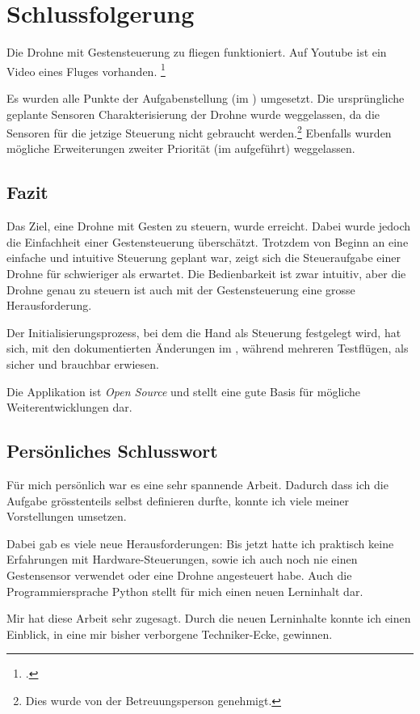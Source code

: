 \chapter{Schlussfolgerung}
Die Drohne mit Gestensteuerung zu fliegen funktioniert.
Auf Youtube ist ein Video eines Fluges vorhanden.
\footcite{Crazyflie_20_with_Leap_Motion_Gesture_controlled_YouTube_2015-09-04}

Es wurden alle Punkte der Aufgabenstellung (im ) umgesetzt. Die ursprüngliche geplante Sensoren Charakterisierung der Drohne wurde weggelassen, da die Sensoren für die jetzige Steuerung nicht gebraucht werden.\footnote{Dies wurde von der Betreuungsperson genehmigt.}
Ebenfalls wurden mögliche Erweiterungen zweiter Priorität (im  aufgeführt) weggelassen.

\section{Fazit}
Das Ziel, eine Drohne mit Gesten zu steuern, wurde erreicht.
Dabei wurde jedoch die Einfachheit einer Gestensteuerung überschätzt.
Trotzdem von Beginn an eine einfache und intuitive Steuerung geplant war, zeigt sich die Steueraufgabe einer Drohne für schwieriger als erwartet.
Die Bedienbarkeit ist zwar intuitiv, aber die Drohne genau zu steuern ist auch mit der Gestensteuerung eine grosse Herausforderung.

Der Initialisierungsprozess, bei dem die Hand als Steuerung festgelegt wird, hat sich, mit den dokumentierten Änderungen im , während mehreren Testflügen, als sicher und brauchbar erwiesen.

Die Applikation ist \textit{Open Source} und stellt eine gute Basis für mögliche Weiterentwicklungen dar.


\section{Persönliches Schlusswort}
Für mich persönlich war es eine sehr spannende Arbeit.
Dadurch dass ich die Aufgabe grösstenteils selbst definieren durfte, konnte ich viele meiner Vorstellungen umsetzen.

Dabei gab es viele neue Herausforderungen:
Bis jetzt hatte ich praktisch keine Erfahrungen mit Hardware-Steuerungen, sowie ich auch noch nie einen Gestensensor verwendet oder eine Drohne angesteuert habe.
Auch die Programmiersprache Python stellt für mich einen neuen Lerninhalt dar.

Mir hat diese Arbeit sehr zugesagt.
Durch die neuen Lerninhalte konnte ich einen Einblick, in eine mir bisher verborgene Techniker-Ecke, gewinnen.


